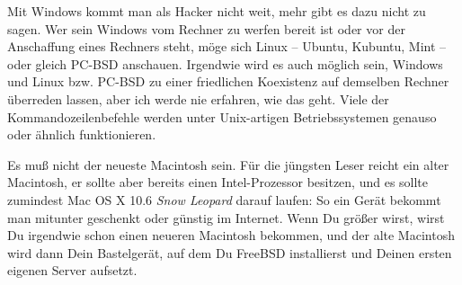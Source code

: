 Mit Windows kommt man als Hacker nicht weit, mehr gibt es dazu nicht zu sagen. Wer sein Windows vom Rechner zu werfen bereit ist oder vor der Anschaffung eines Rechners steht, möge sich Linux – Ubuntu, Kubuntu, Mint – oder gleich PC-BSD anschauen. Irgendwie wird es auch möglich sein, Windows und Linux bzw. PC-BSD zu einer friedlichen Koexistenz auf demselben Rechner überreden lassen, aber ich werde nie erfahren, wie das geht. Viele der Kommandozeilenbefehle werden unter Unix-artigen Betriebssystemen genauso oder ähnlich funktionieren.

Es muß nicht der neueste Macintosh sein. Für die jüngsten Leser reicht ein alter Macintosh, er sollte aber bereits einen Intel-Prozessor besitzen, und es sollte zumindest Mac OS X 10.6 \emph{Snow Leopard} darauf laufen: So ein Gerät bekommt man mitunter geschenkt oder günstig im Internet. Wenn Du größer wirst, wirst Du irgendwie schon einen neueren Macintosh bekommen, und der alte Macintosh wird dann Dein Bastelgerät, auf dem Du FreeBSD installierst und Deinen ersten eigenen Server aufsetzt.
